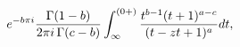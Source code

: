 \[e^{-b\pi i}\frac{\mathop{\Gamma\/}\nolimits\!\left(1-b\right)}{2\pi i\mathop{%
\Gamma\/}\nolimits\!\left(c-b\right)}\int_{\infty}^{(0+)}\frac{t^{b-1}(t+1)^{a%
-c}}{(t-zt+1)^{a}}dt,\]